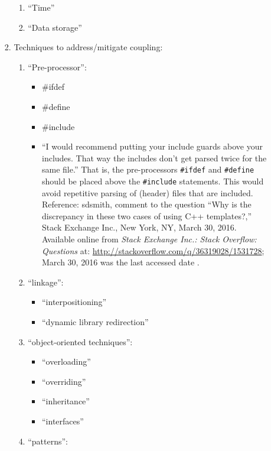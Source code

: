 \begin{enumerate}
\begin{enumerate}
\begin{enumerate}
\begin{enumerate}
			\item ``Time''
			\item ``Data storage''
			\end{enumerate}
		\item Techniques to address/mitigate coupling: \vspace{-0.1cm}
			\begin{enumerate} \itemsep -1pt
			\item ``Pre-processor'': \vspace{-0.1cm}
				\begin{itemize} \itemsep -1pt
				\item \#ifdef
				\item \#define
				\item \#include
				\item ``I would recommend putting your include guards above your includes. That way the includes don't get parsed twice for the same file.'' {\color{red} That is, the pre-processors {\tt \#ifdef} and {\tt \#define} should be placed above the {\tt \#include} statements. This would avoid repetitive parsing of (header) files that are included.} Reference: sdsmith, comment to the question ``Why is the discrepancy in these two cases of using C++ templates?,'' Stack Exchange Inc., New York, NY, March 30, 2016. Available online from {\it Stack Exchange Inc.: Stack Overflow: Questions} at: \url{http://stackoverflow.com/q/36319028/1531728}; March 30, 2016 was the last accessed date \cite{sdsmith2016}.
				\end{itemize}
			\item ``linkage'': \vspace{-0.1cm}
				\begin{itemize} \itemsep -1pt
				\item ``interpositioning''
				\item ``dynamic library redirection''
				\end{itemize}
			\item ``object-oriented techniques'': \vspace{-0.1cm}
				\begin{itemize} \itemsep -1pt
				\item ``overloading''
				\item ``overriding''
				\item ``inheritance''
				\item ``interfaces''
				\end{itemize}
			\item ``patterns'': \vspace{-0.1cm}

\end{enumerate}
\end{enumerate}
\end{enumerate}
\end{enumerate}
